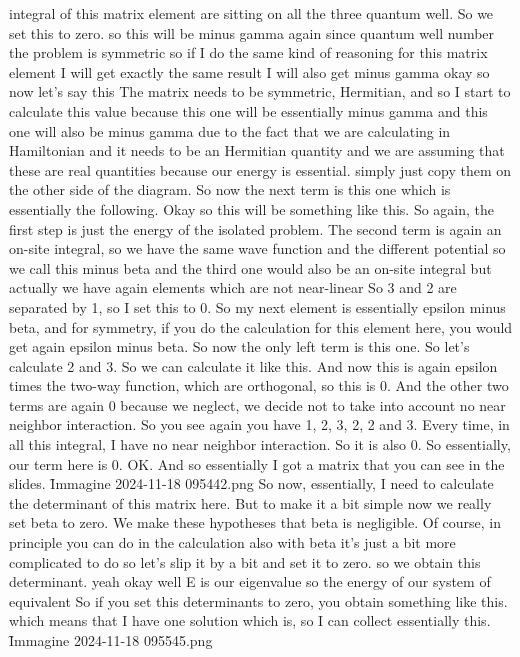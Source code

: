 integral of this matrix element are sitting on all the three quantum well. So we set this to zero. so this will be minus gamma again since quantum well number the problem is symmetric so if I do the same kind of reasoning for this matrix element I will get exactly the same result I will also get minus gamma okay so now let's say this The matrix needs to be symmetric, Hermitian, and so I start to calculate this value because this one will be essentially minus gamma and this one will also be minus gamma due to the fact that we are calculating in Hamiltonian and it needs to be an Hermitian quantity and we are assuming that these are real quantities because our energy is essential. simply just copy them on the other side of the diagram. So now the next term is this one which is essentially the following. Okay so this will be something like this. So again, the first step is just the energy of the isolated problem. The second term is again an on-site integral, so we have the same wave function and the different potential so we call this minus beta and the third one would also be an on-site integral but actually we have again elements which are not near-linear So 3 and 2 are separated by 1, so I set this to 0. So my next element is essentially epsilon minus beta, and for symmetry, if you do the calculation for this element here, you would get again epsilon minus beta. So now the only left term is this one. So let's calculate 2 and 3. So we can calculate it like this. And now this is again epsilon times the two-way function, which are orthogonal, so this is 0. And the other two terms are again 0 because we neglect, we decide not to take into account no near neighbor interaction. So you see again you have 1, 2, 3, 2, 2 and 3. Every time, in all this integral, I have no near neighbor interaction. So it is also 0. So essentially, our term here is 0. OK. And so essentially I got a matrix that you can see in the slides.
\f{Immagine 2024-11-18 095442.png}
So now, essentially, I need to calculate the determinant of this matrix here. But to make it a bit simple now we really set beta to zero. We make these hypotheses that beta is negligible. Of course, in principle you can do in the calculation also with beta it's just a bit more complicated to do so let's slip it by a bit and set it to zero. so we obtain this determinant. yeah okay well E is our eigenvalue so the energy of our system of equivalent So if you set this determinants to zero, you obtain something like this. which means that I have one solution which is, so I can collect essentially this.
\f{Immagine 2024-11-18 095545.png}
